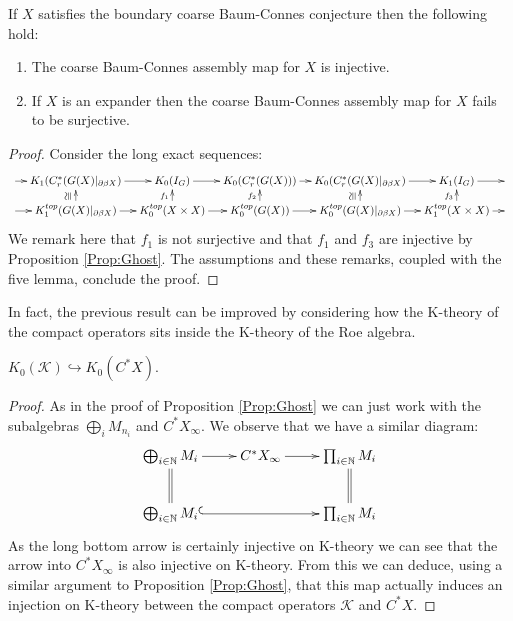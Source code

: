 \begin{proposition}\label{Prop:Cor}
If $X$ satisfies the boundary coarse Baum-Connes conjecture then the following hold:
\begin{enumerate}
\item The coarse Baum-Connes assembly map for $X$ is injective.
\item If $X$ is an expander then the coarse Baum-Connes assembly map for $X$ fails to be surjective.
\end{enumerate}
\end{proposition}
\begin{proof}
Consider the long exact sequences:
$$
\xymatrix@=1em{\ar[r] &
K_{1}(C^{*}_{r}(G(X)|_{\partial\beta X}) \ar[r] & K_{0}(I_{G}) \ar[r]& K_{0}(C^{*}_{r}(G(X))) \ar[r]& K_{0}(C^{*}_{r}(G(X)|_{\partial\beta X})\ar[r] & K_{1}(I_{G}) \ar[r] & \\
\ar[r] & K_{1}^{top}(G(X)|_{\partial\beta X}) \ar[r] \ar[u]^{\ucong}& K_{0}^{top}(X \times X) \ar[r]\ar[u]^{f_{1}}& K_{0}^{top}(G(X)) \ar[r]\ar[u]^{f_{2}}& K_{0}^{top}(G(X)|_{\partial\beta X}) \ar[r]\ar[u]^{\ucong}& K_{1}^{top}(X \times X)\ar[u]^{f_{3}} \ar[r] & 
}
$$
We remark here that $f_{1}$ is not surjective and that $f_{1}$ and $f_{3}$ are injective by Proposition \ref{Prop:Ghost}. The assumptions and these remarks, coupled with the five lemma, conclude the proof.
\end{proof}

In fact, the previous result can be improved by considering how the K-theory of the compact operators sits inside the K-theory of the Roe algebra.

\begin{proposition}\label{Prop:subCool}
$K_{0}(\mathcal{K}) \hookrightarrow K_{0}(C^{*}X)$.
\end{proposition}
\begin{proof}
As in the proof of Proposition \ref{Prop:Ghost} we can just work with the subalgebras $\bigoplus_{i}M_{n_{i}}$ and $C^{*}X_{\infty}$. We observe that we have a similar diagram:
\begin{equation*}
\xymatrix{\bigoplus_{i \in \mathbb{N}} M_{i} \ar@{->}[r]\ar@{=}[d]  &  C^{*}X_{\infty} \ar@{->}[r]& \prod_{i\in \mathbb{N}}M_{i}\ar@{=}[d]\\
\bigoplus_{i \in \mathbb{N}} M_{i}\ar@{^{(}->}[rr] &  & \prod_{i\in \mathbb{N}}M_{i}
}
\end{equation*}
As the long bottom arrow is certainly injective on K-theory we can see that the arrow into $C^{*}X_{\infty}$ is also injective on K-theory. From this we can deduce, using a similar argument to Proposition \ref{Prop:Ghost}, that this map actually induces an injection on K-theory between the compact operators $\mathcal{K}$ and $C^{*}X$.
\end{proof}


